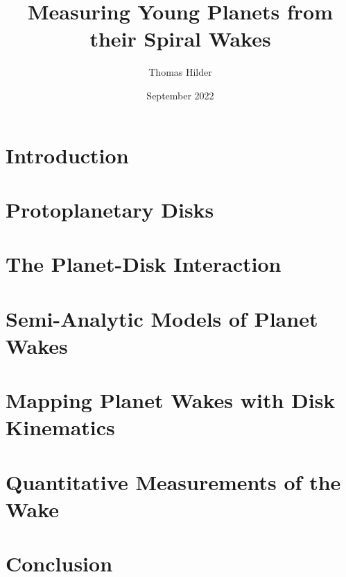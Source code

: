 \documentclass[11pt,a4paper,onecolumn]{report}
\title{Measuring Young Planets from their Spiral Wakes}
\author{Thomas Hilder}
\date{September 2022}
\begin{document}
    
    

    

    

    

    \tableofcontents
    \clearpage


    \chapter{Introduction}
    

    \chapter{Protoplanetary Disks}
    

    \chapter{The Planet-Disk Interaction}
    

    \chapter{Semi-Analytic Models of Planet Wakes}
    

    \chapter{Mapping Planet Wakes with Disk Kinematics}
    

    \chapter{Quantitative Measurements of the Wake}
    

    \chapter{Conclusion}
    

    \appendix
    

    
    
\end{document}
